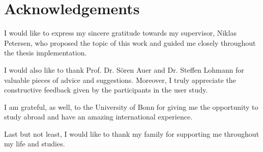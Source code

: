 \chapter*{Acknowledgements}

I would like to express my sincere gratitude towards my supervisor, Niklas Petersen, who proposed the topic of this work and guided me closely throughout the thesis implementation.

I would also like to thank Prof. Dr. Sören Auer and Dr. Steffen Lohmann for valuable pieces of advice and suggestions. Moreover, I truly appreciate the constructive feedback given by the participants in the user study.

I am grateful, as well, to the University of Bonn for giving me the opportunity to study abroad and have an amazing international experience.

Last but not least, I would like to thank my family for supporting me throughout my life and studies.
